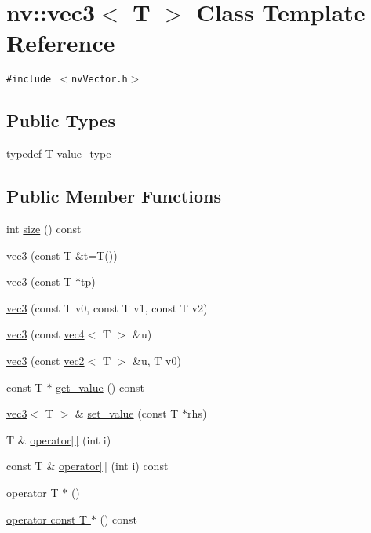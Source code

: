 \hypertarget{classnv_1_1vec3}{
\section{nv::vec3$<$ T $>$ Class Template Reference}
\label{classnv_1_1vec3}
}
{\tt \#include $<$nvVector.h$>$}

\subsection*{Public Types}
\begin{CompactItemize}
\item 
typedef T \hyperlink{classnv_1_1vec3_c9b2ba01240d87192bbdd37f52979cb7}{value\_\-type}
\end{CompactItemize}
\subsection*{Public Member Functions}
\begin{CompactItemize}
\item 
int \hyperlink{classnv_1_1vec3_1f16bfe4486fa47b5c148993d6905433}{size} () const 
\item 
\hyperlink{classnv_1_1vec3_9af8f0a565b0a72e2de05828dc8fd136}{vec3} (const T \&\hyperlink{classnv_1_1vec3_627872f6520734193bb67a93c2b4c77a}{t}=T())
\item 
\hyperlink{classnv_1_1vec3_1185f99bce68e1e55ff562614670540b}{vec3} (const T $\ast$tp)
\item 
\hyperlink{classnv_1_1vec3_00cd5e741e65a508fe47e646ccdd18de}{vec3} (const T v0, const T v1, const T v2)
\item 
\hyperlink{classnv_1_1vec3_cb8594a208cc19189a10d144b9188e7b}{vec3} (const \hyperlink{classnv_1_1vec4}{vec4}$<$ T $>$ \&u)
\item 
\hyperlink{classnv_1_1vec3_b3f0294e4bb187d4a1d1ca0d56a859b4}{vec3} (const \hyperlink{classnv_1_1vec2}{vec2}$<$ T $>$ \&u, T v0)
\item 
const T $\ast$ \hyperlink{classnv_1_1vec3_91339ecb6269c602df94ae275ab538e2}{get\_\-value} () const 
\item 
\hyperlink{classnv_1_1vec3}{vec3}$<$ T $>$ \& \hyperlink{classnv_1_1vec3_5f83b5b9c0cf8ee096e8a962cb6ed7f7}{set\_\-value} (const T $\ast$rhs)
\item 
T \& \hyperlink{classnv_1_1vec3_72dfa9cf18fef05de845fb4283b2fa04}{operator\mbox{[}$\,$\mbox{]}} (int i)
\item 
const T \& \hyperlink{classnv_1_1vec3_f7012d86438ec98f4e648a97a586b301}{operator\mbox{[}$\,$\mbox{]}} (int i) const 
\item 
\hyperlink{classnv_1_1vec3_811a2dd63d6a16dc913871be23285485}{operator T $\ast$} ()
\item 
\hyperlink{classnv_1_1vec3_6f3cd16898b03899397de070de2f0e6f}{operator const T $\ast$} () const 
\end{CompactItemize}
